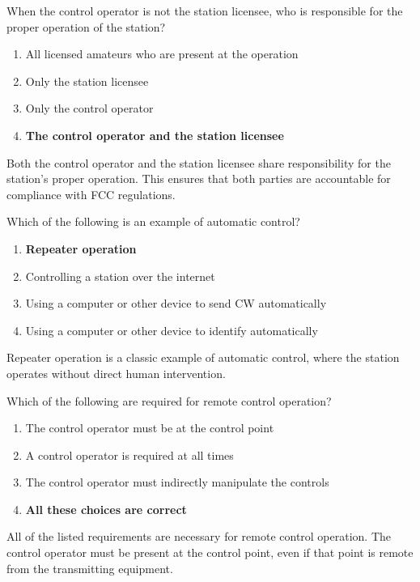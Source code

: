 \begin{tcolorbox}[colback=gray!10!white,colframe=black!75!black,title={T1E07}]
    When the control operator is not the station licensee, who is responsible for the proper operation of the station?
    \begin{enumerate}[label=\Alph*),noitemsep]
        \item All licensed amateurs who are present at the operation
        \item Only the station licensee
        \item Only the control operator
        \item \textbf{The control operator and the station licensee}
    \end{enumerate}
\end{tcolorbox}
Both the control operator and the station licensee share responsibility for the station's proper operation. This ensures that both parties are accountable for compliance with FCC regulations.

\begin{tcolorbox}[colback=gray!10!white,colframe=black!75!black,title={T1E08}]
    Which of the following is an example of automatic control?
    \begin{enumerate}[label=\Alph*),noitemsep]
        \item \textbf{Repeater operation}
        \item Controlling a station over the internet
        \item Using a computer or other device to send CW automatically
        \item Using a computer or other device to identify automatically
    \end{enumerate}
\end{tcolorbox}
Repeater operation is a classic example of automatic control, where the station operates without direct human intervention.

\begin{tcolorbox}[colback=gray!10!white,colframe=black!75!black,title={T1E09}]
    Which of the following are required for remote control operation?
    \begin{enumerate}[label=\Alph*),noitemsep]
        \item The control operator must be at the control point
        \item A control operator is required at all times
        \item The control operator must indirectly manipulate the controls
        \item \textbf{All these choices are correct}
    \end{enumerate}
\end{tcolorbox}
All of the listed requirements are necessary for remote control operation. The control operator must be present at the control point, even if that point is remote from the transmitting equipment.

